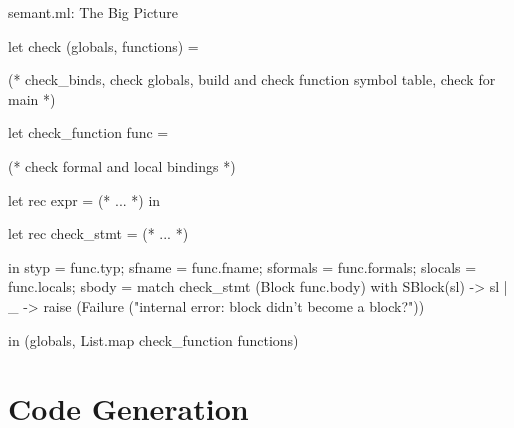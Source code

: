 \documentclass{plt}
\begin{document}
\begin{frame}[fragile=singleslide]{semant.ml: The Big Picture}

\begin{ocaml}
let check (globals, functions) =
  
  (* check_binds, check globals,
     build and check function symbol table, check for main *)

  let check_function func =

    (* check formal and local bindings *)

    let rec expr = (* ... *) in
  
    let rec check_stmt = (* ... *)

  in { styp     = func.typ;
       sfname   = func.fname;
       sformals = func.formals;
       slocals  = func.locals;
       sbody    = match check_stmt (Block func.body) with 
 	 SBlock(sl) -> sl
       | _ -> raise (Failure
               ("internal error: block didn't become a block?"))
  }
  
in (globals, List.map check_function functions)
\end{ocaml}

\end{frame}

\part{Code Generation}
\frame{\partpage}


\newcommand{\phase}[2]{
$\llap{\textsf{#1}}\left\{
\hbox to 10pc{\hfil
\begin{tabular}{c}
#2
\end{tabular}\hfil}
\right.$
}
\newcommand{\transform}[1]{
$\downarrow$\rlap{\hspace{1pc}\textcolor{red}{#1}}
}
\end{document}

